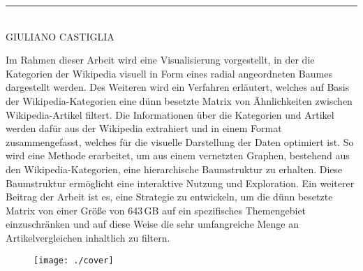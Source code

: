 \vspace{1cm}
\noindent\rule{5cm}{0.4pt}\\
GIULIANO CASTIGLIA

\clearpage


Im Rahmen dieser Arbeit wird eine Visualisierung vorgestellt, in der die Kategorien der Wikipedia visuell in Form eines radial angeordneten Baumes dargestellt werden.
Des Weiteren wird ein Verfahren erläutert, welches auf Basis der Wikipedia-Kategorien eine dünn besetzte Matrix von Ähnlichkeiten zwischen Wikipedia-Artikel filtert.
Die Informationen über die Kategorien und Artikel werden dafür aus der Wikipedia extrahiert und in einem Format zusammengefasst, welches für die visuelle Darstellung der Daten optimiert ist.
So wird eine Methode erarbeitet, um aus einem vernetzten Graphen, bestehend aus den Wikipedia-Kategorien, eine hierarchische Baumstruktur zu erhalten.
Diese Baumstruktur ermöglicht eine interaktive Nutzung und Exploration.
Ein weiterer Beitrag der Arbeit ist es, eine Strategie zu entwickeln, um die dünn besetzte Matrix von einer Größe von 643\,GB auf ein spezifisches Themengebiet einzuschränken und auf diese Weise die sehr umfangreiche Menge an Artikelvergleichen inhaltlich zu filtern.

\begin{figure}[H]
\centering
\texttt{[image: ./cover]}
\label{fig:cover}
\end{figure}



\tableofcontents


\cleardoublepage
{} %


